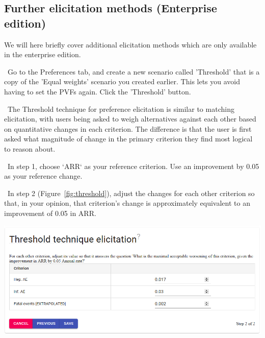 \documentclass[00_mcda_tutorial.tex]{subfiles}
\begin{document}
\begin{sidebar*}

\subsection*{Further elicitation methods (Enterprise edition)}

We will here briefly cover additional elicitation methods which are only available in the enterprise edition.
\newline

\noindent \leftpointright \, Go to the Preferences tab, and create a new scenario called 'Threshold' that is a copy of the 'Equal weights' scenario you created earlier. This lets you avoid having to set the PVFs again. Click the 'Threshold' button.
\newline


\noindent \faGraduationCap \, The Threshold technique for preference elicitation is similar to matching elicitation, with users being asked to weigh alternatives against each other based on quantitative changes in each criterion. The difference is that the user is first asked what magnitude of change in the primary criterion they find most logical to reason about.
\newline

\noindent \leftpointright \, In step 1, choose `ARR` as your reference criterion. Use an improvement by 0.05 as your reference change.
\newline

\noindent \leftpointright \, In step 2 (Figure~\ref{fig:threshold}), adjust the changes for each other criterion so that, in your opinion, that criterion's change is approximately equivalent to an improvement of 0.05 in ARR.
\newline

{
	\centering
    \includegraphics[width=\textwidth]{fig/threshold.png}
    \label{fig:threshold}
    \par
}


\end{sidebar*}
\end{document}
